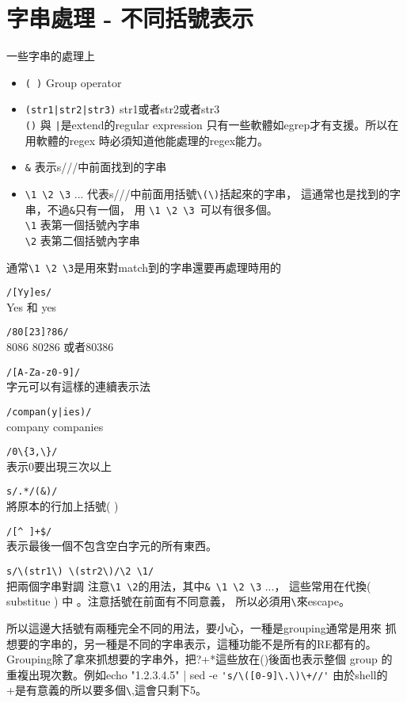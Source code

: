     \section{字串處理 - 不同括號表示}
	一些字串的處理上
	\begin{itemize}
	\item \verb=( )=	Group operator
	\item \verb=(str1|str2|str3)=  str1或者str2或者str3\\
			\verb=()= 與 \verb=|=是extend的regular expression
			只有一些軟體如egrep才有支援。所以在用軟體的regex
			時必須知道他能處理的regex能力。
	\item \verb=&=  表示s///中前面找到的字串
	\item \verb=\1 \2 \3= ... 代表s///中前面用括號\verb=\(\)=括起來的字串，
			這通常也是找到的字串，不過\verb=&=只有一個，
			用 \verb=\1 \2 \3 =可以有很多個。\\
			\verb=\1= 表第一個括號內字串 \\
			\verb=\2= 表第二個括號內字串

	\end{itemize}
	通常\verb=\1 \2 \3=是用來對match到的字串還要再處理時用的
	\begin{description}
          \item \verb=/[Yy]es/= \\
            Yes 和 yes
          \item \verb=/80[23]?86/=\\
            8086 80286 或者80386
          \item \verb=/[A-Za-z0-9]/=\\
            字元可以有這樣的連續表示法
          \item \verb=/compan(y|ies)/=\\
            company companies
          \item \verb=/0\{3,\}/=\\
            表示0要出現三次以上
          \item \verb=s/.*/(&)/=\\
            將原本的行加上括號( )
          \item \verb=/[^ ]+$/ =\\
            表示最後一個不包含空白字元的所有東西。
          \item \verb=s/\(str1\) \(str2\)/\2 \1/=\\
            把兩個字串對調  注意\verb=\1 \2=的用法，其中\verb=& \1 \2 \3=
            ...， 這些常用在代換( substitue ) 中 。注意括號在前面有不同意義，
            所以必須用\verb=\=來escape。
	\end{description}
	所以這邊大括號有兩種完全不同的用法，要小心，一種是grouping通常是用來
	抓想要的字串的，另一種是不同的字串表示，這種功能不是所有的RE都有的。
	Grouping除了拿來抓想要的字串外，把?+*這些放在()後面也表示整個 group 的
	重複出現次數。例如echo "1.2.3.4.5" | sed -e \verb='s/\([0-9]\.\)\+//'=
	由於shell的+是有意義的所以要多個\verb=\=,這會只剩下5。
